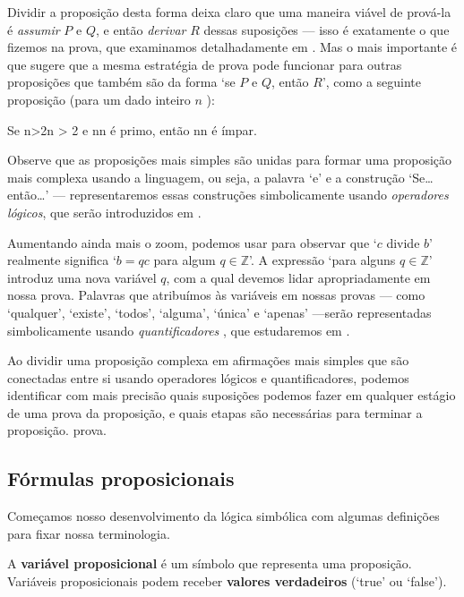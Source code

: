 Dividir a proposição desta forma deixa claro que uma maneira viável de prová-la é \textit{assumir} $P$ e $Q$, e então \textit{derivar} $R$ dessas suposições --- isso é exatamente o que fizemos na prova, que examinamos detalhadamente em . Mas o mais importante é que sugere que a mesma estratégia de prova pode funcionar para outras proposições que também são da forma `se $P$ e $Q$, então $R$', como a seguinte proposição (para um dado inteiro $n$ ):

\begin{center}
Se n>2n > 2 e nn é primo, então nn é ímpar.
\end{center}

Observe que as proposições mais simples são unidas para formar uma proposição mais complexa usando a linguagem, ou seja, a palavra `e' e a construção `Se\dots{} então\dots{}' --- representaremos essas construções simbolicamente usando \textit {operadores lógicos}, que serão introduzidos em .

Aumentando ainda mais o zoom, podemos usar  para observar que `$c$ divide $b$' realmente significa `$b = qc$ para algum $q \in \mathbb{Z}$'. A expressão `para alguns $q \in \mathbb{Z}$' introduz uma nova variável $q$, com a qual devemos lidar apropriadamente em nossa prova. Palavras que atribuímos às variáveis ​​em nossas provas --- como `qualquer', `existe', `todos', `alguma', `única' e `apenas' ---serão representadas simbolicamente usando \textit{quantificadores} , que estudaremos em .

Ao dividir uma proposição complexa em afirmações mais simples que são conectadas entre si usando operadores lógicos e quantificadores, podemos identificar com mais precisão quais suposições podemos fazer em qualquer estágio de uma prova da proposição, e quais etapas são necessárias para terminar a proposição. prova.

\subsection*{Fórmulas proposicionais}

Começamos nosso desenvolvimento da lógica simbólica com algumas definições para fixar nossa terminologia.

\begin{definition}
\label{defPropositionalVariable}
A \textbf{variável proposicional} é um símbolo que representa uma proposição. Variáveis ​​proposicionais podem receber \textbf{valores verdadeiros} (`true' ou `false').
\end{definition}

